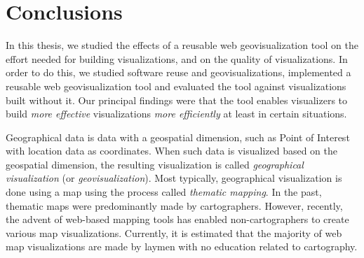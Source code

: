 
\chapter{Conclusions}
\label{chapter:conclusions}

In this thesis, we studied the effects of a reusable web geovisualization tool on the effort needed for building visualizations, and on the quality of visualizations. In order to do this, we studied software reuse and geovisualizations, implemented a reusable web geovisualization tool and evaluated the tool against visualizations built without it. Our principal findings were that the tool enables visualizers to build \emph{more effective} visualizations \emph{more efficiently} at least in certain situations.

Geographical data is data with a geospatial dimension, such as Point of Interest with location data as coordinates. When such data is visualized based on the geospatial dimension, the resulting visualization is called \emph{geographical visualization} (or \emph{geovisualization}). Most typically, geographical visualization is done using a map using the process called \emph{thematic mapping}. In the past, thematic maps were predominantly made by cartographers. However, recently, the advent of web-based mapping tools has enabled non-cartographers to create various map visualizations. Currently, it is estimated that the majority of web map visualizations are made by laymen with no education related to cartography.



